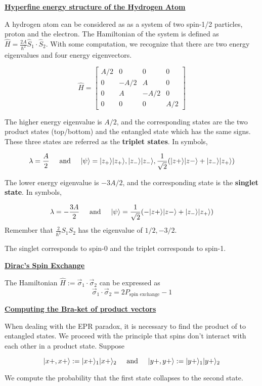 \documentclass{article}
\DeclarePairedDelimiter\ket{\lvert}{\rangle}
\newcommand{\new}[1]{
    \vspace{2mm}
    \noindent
    \textbf{
    \underline{#1}}
}
\newcommand{\textAnd}{
    {
        \hspace{5mm}
        \textrm{and}
        \hspace{5mm}
    }
}
\begin{document}
\new{Hyperfine energy structure of the Hydrogen Atom}
A hydrogen atom can be considered as as a system of two 
spin-1/2 particles, proton and the electron. The Hamiltonian 
of the system is defined as $\hat{H} = \frac{2A}{\hbar^2}\hat{S}_1\cdot \hat{S}_2$. 
With some computation, we recognize that there are two energy 
eigenvalues and four energy eigenvectors. 

\[
    \hat{H} = 
    \begin{bmatrix}
        A/2 & 0 & 0 & 0 \\
        0 & -A/2& A & 0 \\
        0 & A & -A/2& 0 \\
        0 & 0 & 0 &A/2
    \end{bmatrix}
\]




The higher energy eigenvalue is $A/2$, and the 
corresponding states are the two product states (top/bottom) and 
the entangled state which has the same signs. 
These three states are referred as the \textbf{triplet states}. 
In symbols, 

\[
    \lambda = \frac{A}{2} \textAnd \ket{\psi} = \ket{z_+}\ket{z_+}, 
    \ket{z_-}\ket{z_-}, 
    \frac{1}{\sqrt{2}}(\ket{z+}\ket{z-} + \ket{z_-}\ket{z_+})
\]

The lower energy eigenvalue is $-3A/2$, and the 
corresponding state is the \textbf{singlet state}. In symbols, 


\[
    \lambda = -\frac{3A}{2} \textAnd \ket{\psi} = 
    \frac{1}{\sqrt{2}}(-\ket{z+}\ket{z-} + \ket{z_-}\ket{z_+})
\]
Remember that $\frac{2}{\hbar^2}S_1S_2$ has the eigenvalue of $1/2, -3/2$.

The singlet corresponds to spin-0 and the triplet corresponds to 
spin-1. 

\new{Dirac's Spin Exchange} 
The Hamiltonian $\hat{H} := \vec\sigma_1\cdot \vec\sigma_2$
can be expressed as 
\[
    \vec\sigma_1\cdot \vec\sigma_2 = 
    2P_{\textrm{spin exchange}} - 1
\]

\new{Computing the Bra-ket of product vectors}
When dealing with the EPR paradox, it is necessary 
to find the product of to entangled states. We proceed
with the principle that spins don't interact with each 
other in a product state. Suppose

\[
    \ket{x+, x+} := \ket{x+}_1 \ket{x+}_2
    \textAnd 
    \ket{y+, y+} := \ket{y+}_1 \ket{y+}_2
\]

We compute the probability that the first state 
collapses to the second state. 
\end{document}
